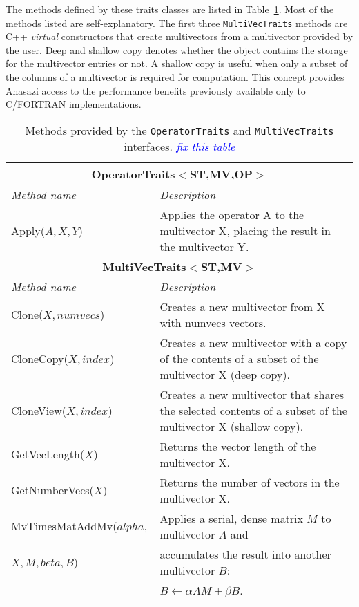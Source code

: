 \documentclass[acmtoms]{acmtrans2m}
\newcommand{\aspace}[1]{\texttt{#1}}
\newcommand{\cbcomm}[1]{\textcolor{blue}{\emph{#1}}}
\begin{document}
The methods defined by these traits classes are listed in
Table~\ref{tab:anasazi:mvt}. Most of the methods listed are
self-explanatory. The first three \aspace{MultiVecTraits} methods are
C++ \emph{virtual} constructors \cite[pp.~123--129]{meyers:96} that
create multivectors from a multivector provided by the user. Deep and
shallow copy denotes whether the object contains the storage for the
multivector entries or not. A shallow copy is useful when only a
subset of the columns of a multivector is required for computation.
This concept provides Anasazi access to the performance benefits
previously available only to C/FORTRAN implementations.

\begin{table}
\begin{center}
  \caption{Methods provided by the \aspace{OperatorTraits} and
  \aspace{MultiVecTraits} interfaces. \cbcomm{fix this table}}
\label{tab:anasazi:mvt}
\begin{tabular}{| p{4cm} | p{8cm} |}
\hline
\multicolumn{2}{|c|}{\textbf{OperatorTraits$<$ST,MV,OP$>$}} \\\hline
\emph{Method name} & \emph{Description} \\\hline
Apply($A,X,Y$) & Applies the operator A to the multivector X, placing the
result in the multivector Y. \\\hline\hline
\multicolumn{2}{|c|}{\textbf{MultiVecTraits$<$ST,MV$>$}} \\\hline
\emph{Method name} & \emph{Description} \\\hline
Clone($X,numvecs$)           & Creates a new multivector from X with
numvecs vectors.  \\\hline

CloneCopy($X,index$) & Creates a new multivector with a copy of the contents of
a subset of the multivector X (deep copy). \\\hline

CloneView($X,index$) & Creates a new multivector that shares the selected
contents of a subset of the multivector X (shallow copy).  \\\hline

GetVecLength($X$) & Returns the vector length of the multivector X.
\\\hline

GetNumberVecs($X$)& Returns the number of vectors in the multivector X.
\\\hline

MvTimesMatAddMv($alpha,$ & Applies a serial, dense matrix $M$ to multivector $A$ and \\ 
           $X,M,beta,B$) & accumulates the result into another multivector $B$:\\ & $B \leftarrow \alpha A M + \beta B$.  \\\hline


\end{tabular}
\end{center}
\end{table}
\end{document}
